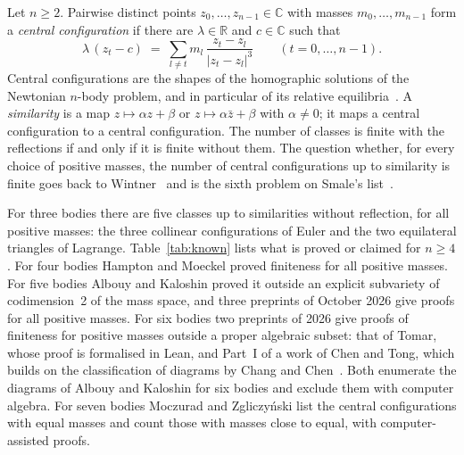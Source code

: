 \documentclass[11pt]{amsart}
\theoremstyle{definition}
\theoremstyle{remark}
\numberwithin{equation}{section}
\newcommand{\CC}{\mathbb{C}}
\newcommand{\RR}{\mathbb{R}}
\begin{document}
Let $n \ge 2$. Pairwise distinct points $z_0, \dots, z_{n-1} \in \CC$ with masses $m_0, \dots, m_{n-1}$
form a \emph{central configuration} if there are $\lambda \in \RR$ and $c \in \CC$ such that
\begin{equation}\label{eq:cc}
  \lambda\,(z_t - c) \;=\; \sum_{l \ne t} m_l\, \frac{z_t - z_l}{|z_t - z_l|^{3}}
  \qquad (t = 0, \dots, n-1).
\end{equation}
Central configurations are the shapes of the homographic solutions of the Newtonian $n$-body problem,
and in particular of its relative equilibria~\cite{wintner1941}. A \emph{similarity} is a map
$z \mapsto \alpha z + \beta$ or $z \mapsto \alpha \bar z + \beta$ with $\alpha \ne 0$; it maps a central
configuration to a central configuration. The number of classes is finite with the reflections if and
only if it is finite without them. The question whether, for every choice of positive masses, the
number of central configurations up to similarity is finite goes back to Wintner~\cite{wintner1941} and
is the sixth problem on Smale's list~\cite{smale1998}.

For three bodies there are five classes up to similarities without reflection, for all positive masses:
the three collinear configurations of Euler and the two equilateral triangles of Lagrange.
Table~\ref{tab:known} lists what is proved or claimed for $n \ge 4$. For four bodies Hampton and Moeckel proved finiteness for all positive masses.
For five bodies Albouy and Kaloshin proved it outside an explicit subvariety of codimension~2 of the mass
space, and three preprints of October 2026 give proofs for all positive masses. For six bodies two preprints
of 2026 give proofs of finiteness for positive masses outside a proper algebraic subset: that of Tomar, whose
proof is formalised in Lean, and Part~I of a work of Chen and Tong, which builds on the classification of
diagrams by Chang and Chen~\cite{changchen2024jsc,changchen2025siads}. Both enumerate the diagrams of
Albouy and Kaloshin for six bodies and exclude them with computer algebra. For seven bodies Moczurad
and Zgliczy\'nski list the central configurations with equal masses and count those with masses close
to equal, with computer-assisted proofs.
\end{document}
